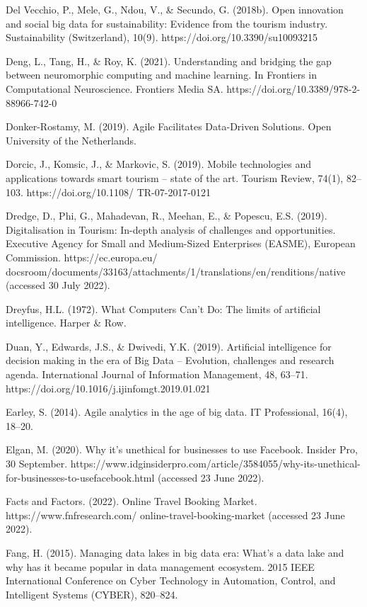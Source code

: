 \documentclass[
  letterpaper,
  DIV=11,
  numbers=noendperiod]{scrreprt}
\begin{document}
Del Vecchio, P., Mele, G., Ndou, V., \& Secundo, G. (2018b). Open
innovation and social big data for sustainability: Evidence from the
tourism industry. Sustainability (Switzerland), 10(9).
https://doi.org/10.3390/su10093215

Deng, L., Tang, H., \& Roy, K. (2021). Understanding and bridging the
gap between neuromorphic computing and machine learning. In Frontiers in
Computational Neuroscience. Frontiers Media SA.
https://doi.org/10.3389/978-2-88966-742-0

Donker-Rostamy, M. (2019). Agile Facilitates Data-Driven Solutions. Open
University of the Netherlands.

Dorcic, J., Komsic, J., \& Markovic, S. (2019). Mobile technologies and
applications towards smart tourism -- state of the art. Tourism Review,
74(1), 82--103. https://doi.org/10.1108/ TR-07-2017-0121

Dredge, D., Phi, G., Mahadevan, R., Meehan, E., \& Popescu, E.S. (2019).
Digitalisation in Tourism: In-depth analysis of challenges and
opportunities. Executive Agency for Small and Medium-Sized Enterprises
(EASME), European Commission. https://ec.europa.eu/
docsroom/documents/33163/attachments/1/translations/en/renditions/native
(accessed 30 July 2022).

Dreyfus, H.L. (1972). What Computers Can't Do: The limits of artificial
intelligence. Harper \& Row.

Duan, Y., Edwards, J.S., \& Dwivedi, Y.K. (2019). Artificial
intelligence for decision making in the era of Big Data -- Evolution,
challenges and research agenda. International Journal of Information
Management, 48, 63--71. https://doi.org/10.1016/j.ijinfomgt.2019.01.021

Earley, S. (2014). Agile analytics in the age of big data. IT
Professional, 16(4), 18--20.

Elgan, M. (2020). Why it's unethical for businesses to use Facebook.
Insider Pro, 30 September.
https://www.idginsiderpro.com/article/3584055/why-its-unethical-for-businesses-to-usefacebook.html
(accessed 23 June 2022).

Facts and Factors. (2022). Online Travel Booking Market.
https://www.fnfresearch.com/ online-travel-booking-market (accessed 23
June 2022).

Fang, H. (2015). Managing data lakes in big data era: What's a data lake
and why has it became popular in data management ecosystem. 2015 IEEE
International Conference on Cyber Technology in Automation, Control, and
Intelligent Systems (CYBER), 820--824.
\end{document}
